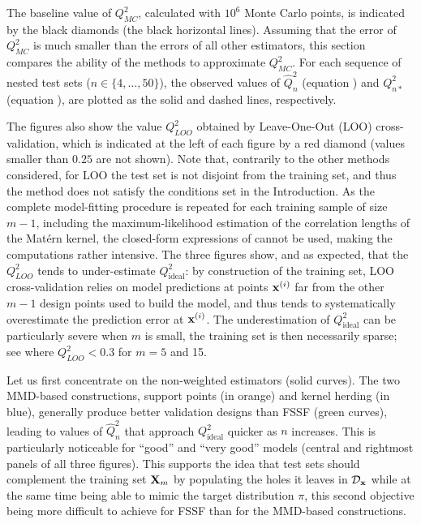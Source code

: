 The baseline value of $Q_{MC}^2$, calculated with $10^6$ Monte Carlo points, is indicated by the black diamonds (the black horizontal lines).
Assuming that the error of $Q_{MC}^2$ is much smaller than the errors of all other estimators, this section compares the ability of the methods to approximate $Q_{MC}^2$. 
For each sequence of nested test sets ($n\in\{4,\ldots,50\}$), the observed values of $\widehat Q^2_n$ (equation ) and $Q_{n*}^2$ (equation ), are plotted as the solid and dashed lines, respectively. 

The figures also show the value $Q^2_{LOO}$ obtained by Leave-One-Out (LOO) cross-validation, which is indicated at the left of each figure by a red diamond (values smaller than $0.25$ are not shown). 
Note that, contrarily to the other methods considered, for LOO the test set is not disjoint from the training set, and thus the method does not satisfy the conditions set in the Introduction. 
As the complete model-fitting procedure is repeated for each training sample of size $m-1$, including the maximum-likelihood estimation of the correlation lengths of the Matérn kernel, the closed-form expressions of \citet{Dubrule83} cannot be used, making the computations rather intensive. 
The three figures show, and as expected, that the $Q_{LOO}^2$ tends to under-estimate $Q_{\mathrm{ideal}}^2$: by construction of the training set, LOO cross-validation relies on model predictions at points ${\bf x}^{(i)}$ far from the other $m-1$ design points used to build the model, and thus tends to systematically overestimate the prediction error at ${\bf x}^{(i)}$. 
The underestimation of $Q_{\mathrm{ideal}}^2$ can be particularly severe when $m$ is small, the training set is then necessarily sparse; see  where $Q_{LOO}^2<0.3$ for $m=5$ and 15. 

Let us first concentrate on the non-weighted estimators (solid curves). 
The two MMD-based constructions, support points (in orange) and kernel herding (in blue), generally produce better validation designs than FSSF (green curves), leading to values of $\widehat Q^2_n$ that approach $Q_{\mathrm{ideal}}^2$ quicker as $n$ increases. 
This is particularly noticeable for ``good'' and ``very good'' models (central and rightmost panels of all three figures). 
This supports the idea that test sets should complement the training set ${\bf X}_m$ by populating the holes it leaves in $\mathcal{D}_{\bf x}$ while at the same time being able to mimic the target distribution $\pi$, this second objective being more difficult to achieve for FSSF than for the MMD-based constructions. 

